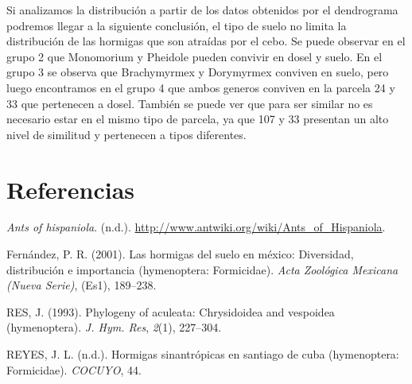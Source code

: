 \documentclass[11pt,]{article}
\begin{document}
Si analizamos la distribución a partir de los datos obtenidos por el
dendrograma podremos llegar a la siguiente conclusión, el tipo de suelo
no limita la distribución de las hormigas que son atraídas por el cebo.
Se puede observar en el grupo 2 que Monomorium y Pheidole pueden
convivir en dosel y suelo. En el grupo 3 se observa que Brachymyrmex y
Dorymyrmex conviven en suelo, pero luego encontramos en el grupo 4 que
ambos generos conviven en la parcela 24 y 33 que pertenecen a dosel.
También se puede ver que para ser similar no es necesario estar en el
mismo tipo de parcela, ya que 107 y 33 presentan un alto nivel de
similitud y pertenecen a tipos diferentes.

\section*{Referencias}\label{referencias}

\hypertarget{refs}{}
\hypertarget{ref-Antwiki}{}
\emph{Ants of hispaniola}. (n.d.).
\url{http://www.antwiki.org/wiki/Ants_of_Hispaniola}.

\hypertarget{ref-fernandez2001hormigas}{}
Fernández, P. R. (2001). Las hormigas del suelo en méxico: Diversidad,
distribución e importancia (hymenoptera: Formicidae). \emph{Acta
Zoológica Mexicana (Nueva Serie)}, (Es1), 189--238.

\hypertarget{ref-res1993phylogeny}{}
RES, J. (1993). Phylogeny of aculeata: Chrysidoidea and vespoidea
(hymenoptera). \emph{J. Hym. Res}, \emph{2}(1), 227--304.

\hypertarget{ref-reyeshormigas}{}
REYES, J. L. (n.d.). Hormigas sinantrópicas en santiago de cuba
(hymenoptera: Formicidae). \emph{COCUYO}, 44.




\newpage
\singlespacing 
\end{document}
